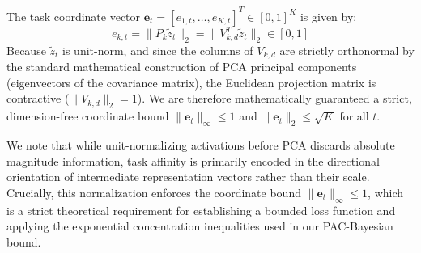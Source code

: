 The task coordinate vector $\mathbf{e}_t = [e_{1, t}, \dots, e_{K, t}]^T \in [0, 1]^K$ is given by:
\begin{equation}
    e_{k, t} = \|P_k \tilde{z}_t\|_2 = \|V_{k, d}^T \tilde{z}_t\|_2 \in [0, 1]
\end{equation}
Because $\tilde{z}_t$ is unit-norm, and since the columns of $V_{k, d}$ are strictly orthonormal by the standard mathematical construction of PCA principal components (eigenvectors of the covariance matrix), the Euclidean projection matrix is contractive ($\|V_{k, d}\|_2 = 1$). We are therefore mathematically guaranteed a strict, dimension-free coordinate bound $\|\mathbf{e}_t\|_\infty \le 1$ and $\|\mathbf{e}_t\|_2 \le \sqrt{K}$ for all $t$.

We note that while unit-normalizing activations before PCA discards absolute magnitude information, task affinity is primarily encoded in the directional orientation of intermediate representation vectors rather than their scale. Crucially, this normalization enforces the coordinate bound $\|\mathbf{e}_t\|_\infty \le 1$, which is a strict theoretical requirement for establishing a bounded loss function and applying the exponential concentration inequalities used in our PAC-Bayesian bound.

